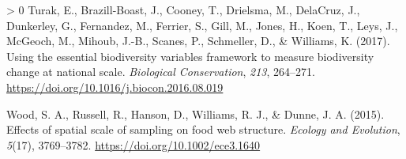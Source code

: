 \documentclass[11pt]{article}
\newlength{\cslhangindent}
\newenvironment{CSLReferences}[3] %
 {%
  \setlength{\parindent}{0pt}
  \ifodd #1 \everypar{\setlength{\hangindent}{\cslhangindent}}\ignorespaces\fi
  \ifnum #2 > 0
  \setlength{\parskip}{#2\baselineskip}
  \fi
 }%
 {}
\begin{document}
\begin{CSLReferences}{1}{0}
\leavevmode\hypertarget{ref-Turak2017UsiEss}{}%
Turak, E., Brazill-Boast, J., Cooney, T., Drielsma, M., DelaCruz, J.,
Dunkerley, G., Fernandez, M., Ferrier, S., Gill, M., Jones, H., Koen,
T., Leys, J., McGeoch, M., Mihoub, J.-B., Scanes, P., Schmeller, D., \&
Williams, K. (2017). Using the essential biodiversity variables
framework to measure biodiversity change at national scale.
\emph{Biological Conservation}, \emph{213}, 264--271.
\url{https://doi.org/10.1016/j.biocon.2016.08.019}

\leavevmode\hypertarget{ref-Wood2015EffSpa}{}%
Wood, S. A., Russell, R., Hanson, D., Williams, R. J., \& Dunne, J. A.
(2015). Effects of spatial scale of sampling on food web structure.
\emph{Ecology and Evolution}, \emph{5}(17), 3769--3782.
\url{https://doi.org/10.1002/ece3.1640}

\end{CSLReferences}
\end{document}
